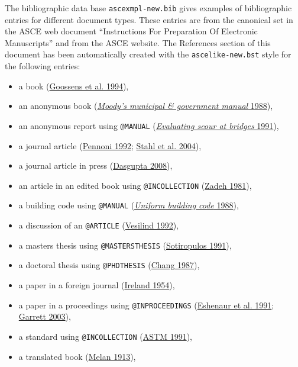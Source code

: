 \documentclass[
  NewProceedings,
  letterpaper]{./assets/ascelike-new}
\begin{document}
The bibliographic data base \texttt{ascexmpl-new.bib} gives examples of
bibliographic entries for different document types. These entries are
from the canonical set in the ASCE web document ``Instructions For
Preparation Of Electronic Manuscripts'' and from the ASCE website. The
References section of this document has been automatically created with
the \texttt{ascelike-new.bst} style for the following entries:

\begin{itemize}
\item
  a book (\protect\hyperlink{ref-Goossens:1994a}{Goossens et al. 1994}),
\item
  an anonymous book (\protect\hyperlink{ref-Moody:1988a}{\emph{Moody's
  municipal \& government manual} 1988}),
\item
  an anonymous report using \texttt{@MANUAL}
  (\protect\hyperlink{ref-FHWA:1991a}{\emph{Evaluating scour at bridges}
  1991}),
\item
  a journal article (\protect\hyperlink{ref-Pennoni:1992a}{Pennoni
  1992}; \protect\hyperlink{ref-Stahl:2004a}{Stahl et al. 2004}),
\item
  a journal article in press
  (\protect\hyperlink{ref-Dasgupta:2008a}{Dasgupta 2008}),
\item
  an article in an edited book using \texttt{@INCOLLECTION}
  (\protect\hyperlink{ref-Zadeh:1981a}{Zadeh 1981}),
\item
  a building code using \texttt{@MANUAL}
  (\protect\hyperlink{ref-ICBO:1988a}{\emph{Uniform building code}
  1988}),
\item
  a discussion of an \texttt{@ARTICLE}
  (\protect\hyperlink{ref-Vesilind:1992a}{Vesilind 1992}),
\item
  a masters thesis using \texttt{@MASTERSTHESIS}
  (\protect\hyperlink{ref-Sotiropulos:1991a}{Sotiropulos 1991}),
\item
  a doctoral thesis using \texttt{@PHDTHESIS}
  (\protect\hyperlink{ref-Chang:1987a}{Chang 1987}),
\item
  a paper in a foreign journal
  (\protect\hyperlink{ref-Ireland:1954a}{Ireland 1954}),
\item
  a paper in a proceedings using \texttt{@INPROCEEDINGS}
  (\protect\hyperlink{ref-Eshenaur:1991a}{Eshenaur et al. 1991};
  \protect\hyperlink{ref-Garrett:2003a}{Garrett 2003}),
\item
  a standard using \texttt{@INCOLLECTION}
  (\protect\hyperlink{ref-ASTM:1991a}{ASTM 1991}),
\item
  a translated book (\protect\hyperlink{ref-Melan:1913a}{Melan 1913}),

\end{itemize}
\end{document}
